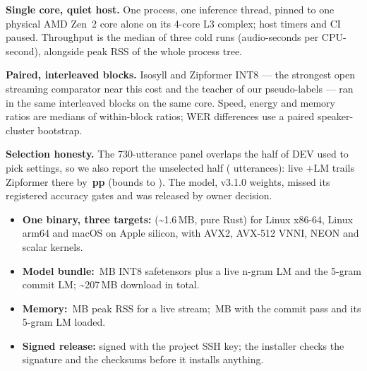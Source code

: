 \documentclass[letterpaper]{article}
\begin{document}
\noindent
\begin{minipage}[t]{0.486\textwidth}
  \vspace{0pt}
  {\fontsize{7.85}{9.9}\selectfont
  \textbf{Single core, quiet host.} One process, one inference thread, pinned to one physical AMD Zen~2 core alone on its 4-core L3 complex; host timers and CI paused. Throughput is the median of three cold runs (audio-seconds per CPU-second), alongside peak RSS of the whole process tree.

  \vspace{2.5pt}
  \textbf{Paired, interleaved blocks.} Isosyll and Zipformer INT8 --- the strongest open streaming comparator near this cost and the teacher of our pseudo-labels --- ran in the same interleaved blocks on the same core. Speed, energy and memory ratios are medians of within-block ratios; WER differences use a paired speaker-cluster bootstrap.

  \vspace{2.5pt}
  \textbf{Selection honesty.} The 730-utterance panel overlaps the half of DEV used to pick settings, so we also report the unselected half (\CandCUtts{} utterances): live +LM trails Zipformer there by \textbf{\CandLiveLmCDelta\,pp} (bounds \CandLiveLmCLo{} to \CandLiveLmCHi). The model, v3.1.0 weights, missed its registered accuracy gates and was released by owner decision.
  }

  \vspace{3.5pt}
  {\fontsize{7.75}{9.8}\selectfont\raggedright
  \begin{itemize}[leftmargin=1.12em,itemsep=1.7pt,topsep=1.5pt]
    \item \textbf{One binary, three targets:}  (\textasciitilde 1.6\,MB, pure Rust) for Linux x86-64, Linux arm64 and macOS on Apple silicon, with AVX2, AVX-512 VNNI, NEON and scalar kernels.
    \item \textbf{Model bundle:} \ColdRcTwoLiveLmModel\,MB INT8 safetensors plus a live n-gram LM and the 5-gram commit LM; \textasciitilde 207\,MB download in total.
    \item \textbf{Memory:} \ColdRcTwoLiveLmRss\,MB peak RSS for a live stream; \ColdRcTwoFinalRss\,MB with the commit pass and its 5-gram LM loaded.
    \item \textbf{Signed release:}  signed with the project SSH key; the installer checks the signature and the checksums before it installs anything.
  \end{itemize}
  }


\end{minipage}
\end{document}
